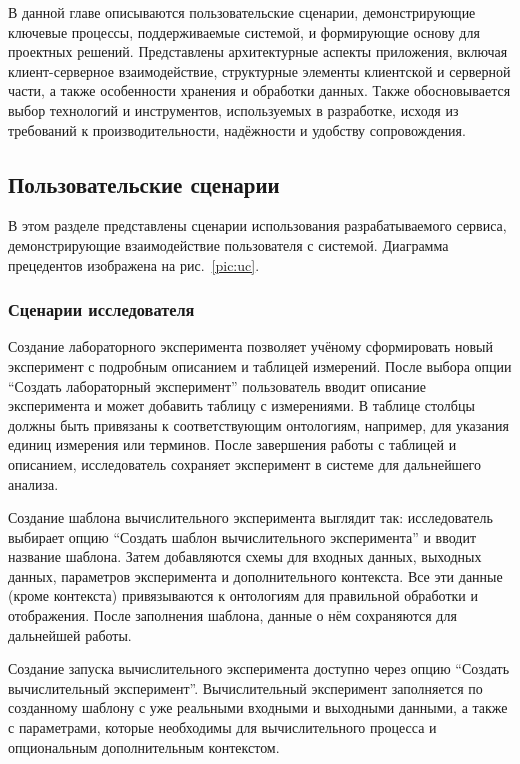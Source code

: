 \setcounter{section}{2}
\setcounter{subsection}{0}


В данной главе описываются пользовательские сценарии, демонстрирующие ключевые процессы, поддерживаемые системой, и формирующие основу для проектных решений.
Представлены архитектурные аспекты приложения, включая клиент-серверное взаимодействие, структурные элементы клиентской и серверной части, а также особенности хранения и обработки данных.
Также обосновывается выбор технологий и инструментов, используемых в разработке, исходя из требований к производительности, надёжности и удобству сопровождения.

\subsection{Пользовательские сценарии}

В этом разделе представлены сценарии использования разрабатываемого сервиса, демонстрирующие взаимодействие пользователя с системой.
Диаграмма прецедентов изображена на рис.~\ref{pic:uc}.

\subsubsection{Сценарии исследователя}

Создание лабораторного эксперимента позволяет учёному сформировать новый эксперимент с подробным описанием и таблицей измерений.
После выбора опции “Создать лабораторный эксперимент” пользователь вводит описание эксперимента и может добавить таблицу с измерениями.
В таблице столбцы должны быть привязаны к соответствующим онтологиям, например, для указания единиц измерения или терминов.
После завершения работы с таблицей и описанием, исследователь сохраняет эксперимент в системе для дальнейшего анализа.

Создание шаблона вычислительного эксперимента выглядит так: исследователь выбирает опцию “Создать шаблон вычислительного эксперимента” и вводит название шаблона.
Затем добавляются схемы для входных данных, выходных данных, параметров эксперимента и дополнительного контекста.
Все эти данные (кроме контекста) привязываются к онтологиям для правильной обработки и отображения.
После заполнения шаблона, данные о нём сохраняются для дальнейшей работы.

Создание запуска вычислительного эксперимента доступно через опцию “Создать вычислительный эксперимент”.
Вычислительный эксперимент заполняется по созданному шаблону с уже реальными входными и выходными данными, а также с параметрами, которые необходимы для вычислительного процесса и опциональным дополнительным контекстом.


